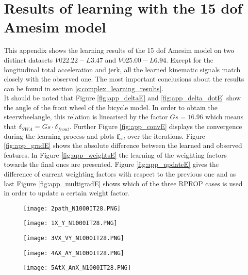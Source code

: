 \chapter{Results of learning with the 15 dof Amesim model}
\label{app:E}
This appendix shows the learning results of the 15 dof Amesim model on two distinct datasets $V022.22 - L3.47$ and $V025.00 - L6.94$. Except for the longitudinal total acceleration and jerk, all the learned kinematic signals match closely with the observed one. The most important conclusions about the results can be found in section \ref{s:complex_learning_results}.\\
It should be noted that Figure \ref{fig:app_deltaE} and \ref{fig:app_delta_dotE}  show the angle of the front wheel of the bicycle model. In order to obtain the steerwheelangle, this relation is linearised by the factor $Gs = 16.96$ which means that $\delta_{SWA} = Gs\cdot\delta_{front}$. Further Figure \ref{fig:app_convE} displays the convergence during the learning process and plots $\bm{f}_{rel}$ over the iterations. Figure \ref{fig:app_gradE} shows the absolute difference between the learned and observed features. In Figure \ref{fig:app_weightsE} the learning of the weighting factors towards the final ones are presented. Figure \ref{fig:app_updateE} gives the difference of current weighting factors with respect to the previous one and as last Figure \ref{fig:app_multigradE} shows which of the three RPROP cases is used in order to update a certain weight factor.



\begin{figure}[h!]
	\centering
	\texttt{[image: 2path\_N1000IT28.PNG]}
\end{figure}

\begin{figure}[h!]
	\centering
	\texttt{[image: 1X\_Y\_N1000IT28.PNG]}
\end{figure}


\begin{figure}[h!]
	\centering
	\texttt{[image: 3VX\_VY\_N1000IT28.PNG]}
\end{figure}


\begin{figure}[h!]
	\centering
	\texttt{[image: 4AX\_AY\_N1000IT28.PNG]}
\end{figure}


\begin{figure}[h!]
	\centering
	\texttt{[image: 5AtX\_AnX\_N1000IT28.PNG]}
\end{figure}

